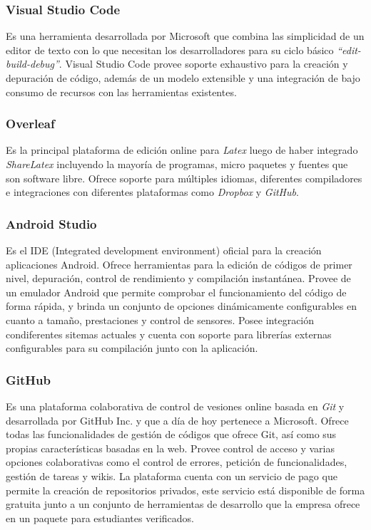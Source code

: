         \subsubsection{Visual Studio Code}
            Es una herramienta desarrollada por Microsoft que combina las simplicidad de un editor de texto con lo que necesitan los desarrolladores para su ciclo básico \textit{``edit-build-debug''}. Visual Studio Code provee soporte exhaustivo para la creación y depuración de código, además de un modelo extensible y una integración de bajo consumo de recursos con las herramientas existentes.

        \subsubsection{Overleaf}
            Es la principal plataforma de edición online para \textit{Latex} luego de haber integrado \textit{ShareLatex} incluyendo la mayoría de programas, micro paquetes y fuentes que son software libre. Ofrece soporte para múltiples idiomas, diferentes compiladores e integraciones con diferentes plataformas como \textit{Dropbox} y \textit{GitHub}.

        \subsubsection{Android Studio}
            Es el IDE (Integrated development environment) oficial para la creación aplicaciones Android. Ofrece herramientas para la edición de códigos de primer nivel, depuración, control de rendimiento y compilación instantánea. Provee de un emulador Android que permite comprobar el funcionamiento del código de forma rápida, y brinda un conjunto de opciones dinámicamente configurables en cuanto a tamaño, prestaciones y control de sensores. Posee integración condiferentes sitemas actuales y cuenta con soporte para librerías externas configurables para su compilación junto con la aplicación.

        \subsubsection{GitHub}
            Es una plataforma colaborativa de control de vesiones online basada en \textit{Git} y desarrollada por GitHub Inc. y que a día de hoy pertenece a Microsoft. Ofrece todas las funcionalidades de gestión de códigos que ofrece Git, así como sus propias características basadas en la web. Provee control de acceso y varias opciones colaborativas como el control de errores, petición de funcionalidades, gestión de tareas y wikis. La plataforma cuenta con un servicio de pago que permite la creación de repositorios privados, este servicio está disponible de forma gratuita junto a un conjunto de herramientas de desarrollo que la empresa ofrece en un paquete para estudiantes verificados.
            
